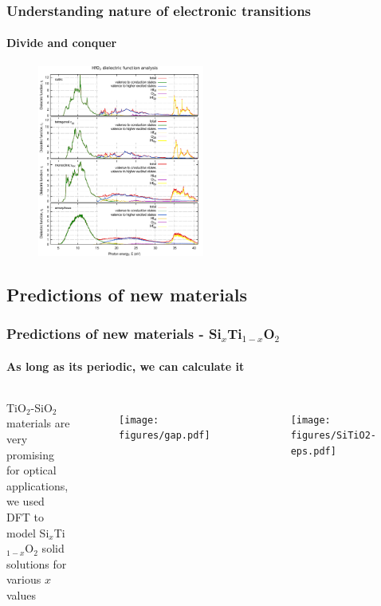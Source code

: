 \documentclass{beamer}
\begin{document}
\begin{frame}
    \frametitle{Understanding nature of electronic transitions}
    \framesubtitle{Divide and conquer}

    \begin{figure}
	\includegraphics[height=6.3cm]{figures/cubic-eps.pdf}
	\end{figure}

\end{frame}

\subsection{Predictions of new materials}
\begin{frame}
    \frametitle{Predictions of new materials - Si$_x$Ti$_{1-x}$O$_2$}
    \framesubtitle{As long as its periodic, we can calculate it}

	\begin{columns}[c]
     TiO$_2$-SiO$_2$ materials are very promising for optical applications, we used DFT to model Si$_x$Ti$_{1-x}$O$_2$ solid solutions for various $x$ values

    \begin{figure}
	\texttt{[image: figures/gap.pdf]}
	\end{figure}

    \begin{figure}
	\texttt{[image: figures/SiTiO2-eps.pdf]}
	\end{figure}

    \end{columns}
\end{frame}
\end{document}
